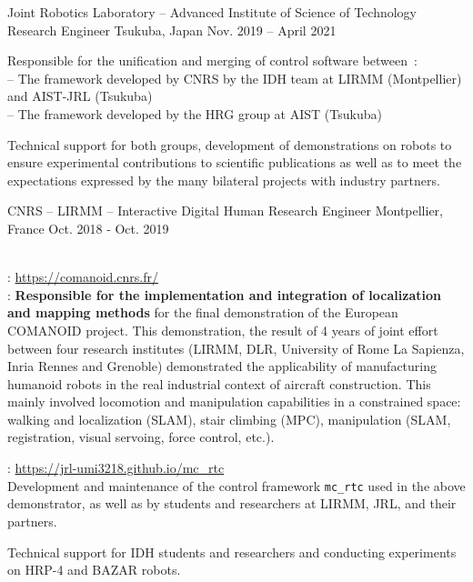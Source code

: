 \begin{cventries}
  \cventry
  {Joint Robotics Laboratory -- Advanced Institute of Science of Technology} %
  {Research Engineer} %
  {Tsukuba, Japan} %
  {Nov. 2019 -- April 2021} %
  {
    \begin{cvitems} %
    \item Responsible for the unification and merging of control software between~:\\
      -- The  framework developed by CNRS by the IDH team at LIRMM (Montpellier)
      and AIST-JRL (Tsukuba)\\
      -- The  framework developed by the HRG group at AIST (Tsukuba)
    \item Technical support for both groups, development of demonstrations on robots to ensure experimental
      contributions to scientific publications as well as to meet the expectations expressed by the many
      bilateral projects with industry partners.
    \end{cvitems}
  }

  \cventry
  {CNRS -- LIRMM -- Interactive Digital Human} %
  {Research Engineer} %
  {Montpellier, France} %
  {Oct. 2018 - Oct. 2019} %
  {
    \begin{cvitems} %
    \item {}\\
      : \url{https://comanoid.cnrs.fr/}\\
      : \textbf{Responsible for the implementation and integration of localization
      and mapping methods} for the final demonstration of the European COMANOID project. This demonstration,
      the result of 4 years of joint effort between four research institutes (LIRMM, DLR, University of Rome
      La Sapienza, Inria Rennes and Grenoble) demonstrated the applicability of manufacturing humanoid robots
      in the real industrial context of aircraft construction. This mainly involved locomotion and
      manipulation capabilities in a constrained space: walking and localization (SLAM), stair climbing
      (MPC), manipulation (SLAM, registration, visual servoing, force control, etc.).
    \item {}: \url{https://jrl-umi3218.github.io/mc_rtc}\\
      Development and maintenance of the control framework {\tt mc\_rtc} used in the above demonstrator, as
      well as by students and researchers at LIRMM, JRL, and their partners.
    \item Technical support for IDH students and researchers and conducting experiments on HRP-4 and BAZAR robots.
    \end{cvitems}
  }


\end{cventries}
